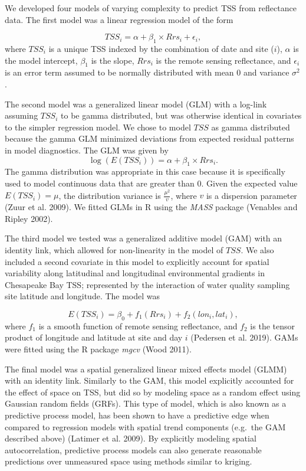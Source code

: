 \documentclass[11pt,]{article}
\begin{document}
We developed four models of varying complexity to predict TSS from
reflectance data. The first model was a linear regression model of the
form

\[TSS_{i} = \alpha + \beta_{1}\times Rrs_i + \epsilon_{i},\] where
\(TSS_i\) is a unique TSS indexed by the combination of date and site
(\(i\)), \(\alpha\) is the model intercept, \(\beta_{1}\) is the slope,
\(Rrs_{i}\) is the remote sensing reflectance, and \(\epsilon_{i}\) is
an error term assumed to be normally distributed with mean 0 and
variance \(\sigma^2\).

The second model was a generalized linear model (GLM) with a log-link
assuming \(TSS_i\) to be gamma distributed, but was otherwise identical
in covariates to the simpler regression model. We chose to model \(TSS\)
as gamma distributed because the gamma GLM minimized deviations from
expected residual patterns in model diagnostics. The GLM was given by
\[\log ({ E(TSS_{i}) })  = \alpha + \beta_{1}\times Rrs_i.\] The gamma
distribution was appropriate in this case because it is specifically
used to model continuous data that are greater than 0. Given the
expected value \(E(TSS_i) = \mu\), the distribution variance is
\(\frac{\mu^2}{v}\), where \(v\) is a dispersion parameter (Zuur et al.
2009). We fitted GLMs in R using the \emph{MASS} package (Venables and
Ripley 2002).

The third model we tested was a generalized additive model (GAM) with an
identity link, which allowed for non-linearity in the model of \(TSS\).
We also included a second covariate in this model to explicitly account
for spatial variability along latitudinal and longitudinal environmental
gradients in Chesapeake Bay TSS; represented by the interaction of water
quality sampling site latitude and longitude. The model was

\[E(TSS_{i}) = \beta_0 + f_1(Rrs_{i}) + f_{2}(lon_{i}, lat_{i}),\] where
\(f_{1}\) is a smooth function of remote sensing reflectance, and
\(f_{2}\) is the tensor product of longitude and latitude at site and
day \(i\) (Pedersen et al. 2019). GAMs were fitted using the R package
\emph{mgcv} (Wood 2011).

The final model was a spatial generalized linear mixed effects model
(GLMM) with an identity link. Similarly to the GAM, this model
explicitly accounted for the effect of space on TSS, but did so by
modeling space as a random effect using Gaussian random fields (GRFs).
This type of model, which is also known as a predictive process model,
has been shown to have a predictive edge when compared to regression
models with spatial trend components (e.g.~the GAM described above)
(Latimer et al. 2009). By explicitly modeling spatial autocorrelation,
predictive process models can also generate reasonable predictions over
unmeasured space using methods similar to kriging.
\end{document}
